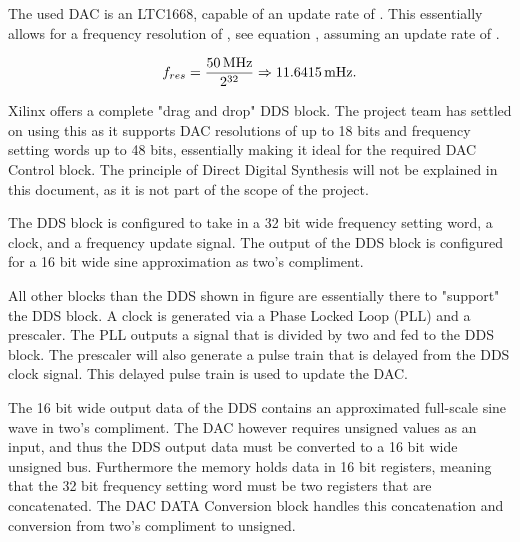The used DAC is an LTC1668, capable of an update rate of . This essentially allows for a frequency resolution of , see equation , assuming an update rate of .

\begin{equation}
    \label{eq:7_2_3_resolution}
    f_{res} = \frac{\SI{50}{\mega\hertz}}{2^{32}} \Rightarrow \SI{11.6415}{\milli\hertz}. 
\end{equation}

Xilinx offers a complete "drag and drop" DDS block. The project team has settled on using this as it supports DAC resolutions of up to 18 bits and frequency setting words up to 48 bits, essentially making it ideal for the required DAC Control block. The principle of Direct Digital Synthesis will not be explained in this document, as it is not part of the scope of the project.

The DDS block is configured to take in a 32 bit wide frequency setting word, a  clock, and a frequency update signal. The output of the DDS block is configured for a 16 bit wide sine approximation as two's compliment.

All other blocks than the DDS shown in figure  are essentially there to "support" the DDS block. A  clock is generated via a Phase Locked Loop (PLL) and a prescaler. The PLL outputs a  signal that is divided by two and fed to the DDS block. The prescaler will also generate a  pulse train that is delayed from the DDS clock signal. This delayed pulse train is used to update the DAC.

The 16 bit wide output data of the DDS contains an approximated full-scale sine wave in two's compliment. The DAC however requires unsigned values as an input, and thus the DDS output data must be converted to a 16 bit wide unsigned bus. Furthermore the memory holds data in 16 bit registers, meaning that the 32 bit frequency setting word must be two registers that are concatenated. The DAC DATA Conversion block handles this concatenation and conversion from two's compliment to unsigned.





